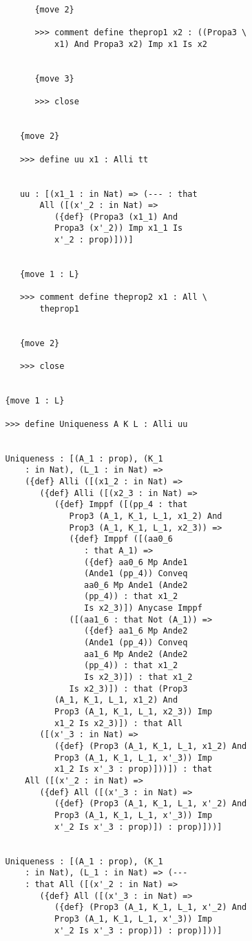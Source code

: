 \documentclass{article}
\begin{document}
\begin{verbatim}
         {move 2}

         >>> comment define theprop1 x2 : ((Propa3 \
             x1) And Propa3 x2) Imp x1 Is x2


         {move 3}

         >>> close


      {move 2}

      >>> define uu x1 : Alli tt


      uu : [(x1_1 : in Nat) => (--- : that 
          All ([(x'_2 : in Nat) => 
             ({def} (Propa3 (x1_1) And 
             Propa3 (x'_2)) Imp x1_1 Is 
             x'_2 : prop)]))]


      {move 1 : L}

      >>> comment define theprop2 x1 : All \
          theprop1


      {move 2}

      >>> close


   {move 1 : L}

   >>> define Uniqueness A K L : Alli uu


   Uniqueness : [(A_1 : prop), (K_1 
       : in Nat), (L_1 : in Nat) => 
       ({def} Alli ([(x1_2 : in Nat) => 
          ({def} Alli ([(x2_3 : in Nat) => 
             ({def} Imppf ([(pp_4 : that 
                Prop3 (A_1, K_1, L_1, x1_2) And 
                Prop3 (A_1, K_1, L_1, x2_3)) => 
                ({def} Imppf ([(aa0_6 
                   : that A_1) => 
                   ({def} aa0_6 Mp Ande1 
                   (Ande1 (pp_4)) Conveq 
                   aa0_6 Mp Ande1 (Ande2 
                   (pp_4)) : that x1_2 
                   Is x2_3)]) Anycase Imppf 
                ([(aa1_6 : that Not (A_1)) => 
                   ({def} aa1_6 Mp Ande2 
                   (Ande1 (pp_4)) Conveq 
                   aa1_6 Mp Ande2 (Ande2 
                   (pp_4)) : that x1_2 
                   Is x2_3)]) : that x1_2 
                Is x2_3)]) : that (Prop3 
             (A_1, K_1, L_1, x1_2) And 
             Prop3 (A_1, K_1, L_1, x2_3)) Imp 
             x1_2 Is x2_3)]) : that All 
          ([(x'_3 : in Nat) => 
             ({def} (Prop3 (A_1, K_1, L_1, x1_2) And 
             Prop3 (A_1, K_1, L_1, x'_3)) Imp 
             x1_2 Is x'_3 : prop)]))]) : that 
       All ([(x'_2 : in Nat) => 
          ({def} All ([(x'_3 : in Nat) => 
             ({def} (Prop3 (A_1, K_1, L_1, x'_2) And 
             Prop3 (A_1, K_1, L_1, x'_3)) Imp 
             x'_2 Is x'_3 : prop)]) : prop)]))]


   Uniqueness : [(A_1 : prop), (K_1 
       : in Nat), (L_1 : in Nat) => (--- 
       : that All ([(x'_2 : in Nat) => 
          ({def} All ([(x'_3 : in Nat) => 
             ({def} (Prop3 (A_1, K_1, L_1, x'_2) And 
             Prop3 (A_1, K_1, L_1, x'_3)) Imp 
             x'_2 Is x'_3 : prop)]) : prop)]))]



\end{verbatim}
\end{document}

